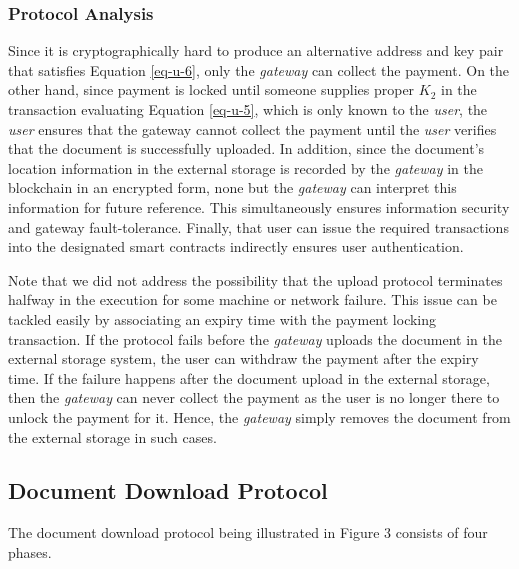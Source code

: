\documentclass[conference]{IEEEtran}
\begin{document}
\subsubsection*{Protocol Analysis}
Since it is cryptographically hard to produce an alternative address and key pair that satisfies Equation \ref{eq-u-6}, only the {\it gateway} can collect the payment. On the other hand, since payment is locked until someone supplies proper $K_2$ in the transaction evaluating Equation \ref{eq-u-5}, which is only known to the {\it user}, the {\it user} ensures that the gateway cannot collect the payment until the {\it user} verifies that the document is successfully uploaded. In addition, since the document's location information in the external storage is recorded by the {\it gateway} in the blockchain in an encrypted form, none but the {\it gateway} can interpret this information for future reference. This simultaneously ensures information security and gateway fault-tolerance. Finally, that user can issue the required transactions into the designated smart contracts indirectly ensures user authentication. 

Note that we did not address the possibility that the upload protocol terminates halfway in the execution for some machine or network failure. This issue can be tackled easily by associating an expiry time with the payment locking transaction. If the protocol fails before the {\it gateway} uploads the document in the external storage system, the user can withdraw the payment after the expiry time. If the failure happens after the document upload in the external storage, then the {\it gateway} can never collect the payment as the user is no longer there to unlock the payment for it. Hence, the {\it gateway} simply removes the document from the external storage in such cases.      

\subsection{Document Download Protocol}
The document download protocol being illustrated in Figure 3 consists of four phases.
\end{document}
